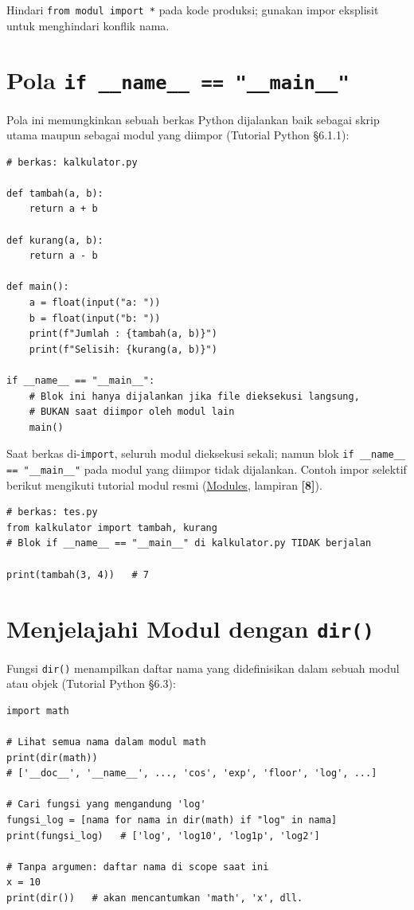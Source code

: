 \documentclass[../main.tex]{subfiles}
\begin{document}
Hindari \texttt{from modul import *} pada kode produksi; gunakan impor eksplisit untuk menghindari konflik nama.

\section{Pola \texttt{if \_\_name\_\_ == "\_\_main\_\_"}}

Pola ini memungkinkan sebuah berkas Python dijalankan baik sebagai skrip utama maupun sebagai modul yang diimpor (Tutorial Python §6.1.1):

\begin{lstlisting}[caption=Pola if \textunderscore\textunderscore name\textunderscore\textunderscore == main]
# berkas: kalkulator.py

def tambah(a, b):
    return a + b

def kurang(a, b):
    return a - b

def main():
    a = float(input("a: "))
    b = float(input("b: "))
    print(f"Jumlah : {tambah(a, b)}")
    print(f"Selisih: {kurang(a, b)}")

if __name__ == "__main__":
    # Blok ini hanya dijalankan jika file dieksekusi langsung,
    # BUKAN saat diimpor oleh modul lain
    main()
\end{lstlisting}

\noindent Saat berkas di-\texttt{import}, seluruh modul dieksekusi sekali; namun blok \texttt{if \_\_name\_\_ == "\_\_main\_\_"} pada modul yang diimpor tidak dijalankan. Contoh impor selektif berikut mengikuti tutorial modul resmi (\href{https://docs.python.org/3/tutorial/modules.html}{Modules}, lampiran \textbf{[8]}).

\begin{lstlisting}[caption=Mengimpor fungsi dari berkas lain menggunakan modul]
# berkas: tes.py
from kalkulator import tambah, kurang
# Blok if __name__ == "__main__" di kalkulator.py TIDAK berjalan

print(tambah(3, 4))   # 7
\end{lstlisting}

\section{Menjelajahi Modul dengan \texttt{dir()}}

Fungsi \texttt{dir()} menampilkan daftar nama yang didefinisikan dalam sebuah modul atau objek (Tutorial Python §6.3):

\begin{lstlisting}[caption=Menjelajahi modul dengan dir()]
import math

# Lihat semua nama dalam modul math
print(dir(math))
# ['__doc__', '__name__', ..., 'cos', 'exp', 'floor', 'log', ...]

# Cari fungsi yang mengandung 'log'
fungsi_log = [nama for nama in dir(math) if "log" in nama]
print(fungsi_log)   # ['log', 'log10', 'log1p', 'log2']

# Tanpa argumen: daftar nama di scope saat ini
x = 10
print(dir())   # akan mencantumkan 'math', 'x', dll.
\end{lstlisting}
\end{document}
